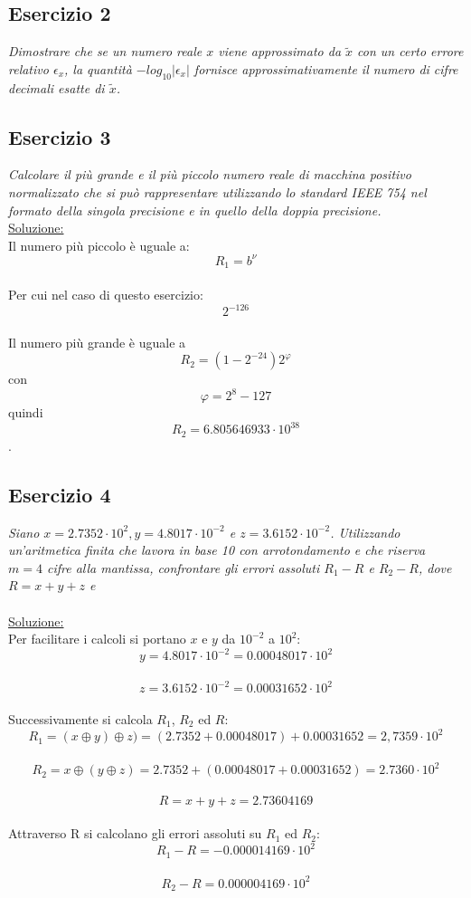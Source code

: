 \subsection{Esercizio 2}
\emph{Dimostrare che se un numero reale $x $ viene approssimato da $\tilde{x}$ con un certo errore relativo $\epsilon_{x}$, la quantità $-log_{10}|\epsilon_{x}|$ fornisce approssimativamente il numero di cifre decimali esatte di $\tilde{x}$.}

\subsection{Esercizio 3}
\emph{Calcolare il più grande e il più piccolo numero reale di macchina positivo normalizzato che si può rappresentare utilizzando lo standard IEEE 754 nel formato della singola precisione e in quello della doppia precisione.}\\
\underline{Soluzione:}\\
Il numero più piccolo è uguale a: $$R_{1} = b^{\nu} $$ \\
Per cui nel caso di questo esercizio: $$2^{-126}$$\\
Il numero più grande è uguale a $$R_{2} = (1-2^{-24}) 2^{\varphi} $$ con $$ \varphi = 2^{8}-127 $$ quindi $$ R_{2} = 6.805646933 \cdot 10^{38}$$.

\subsection{Esercizio 4}
\emph{Siano $ x = 2.7352 \cdot 10^{2}, y = 4.8017 \cdot 10^{-2}$ e $z = 3.6152 \cdot 10^{-2}$. Utilizzando un'aritmetica finita che lavora in base 10 con arrotondamento e che riserva $ m = 4 $ cifre alla mantissa, confrontare gli errori assoluti $ R_{1}-R$ e $R_{2}-R$, dove $ R = x+y+z$ e \\}
 \\
\flushleft
\underline{Soluzione:}\\
Per facilitare i calcoli si portano $ x $ e $ y $ da $ 10 ^ {-2} $ a $ 10^{2} $:\\
$$ y = 4.8017 \cdot 10^{-2} = 0.00048017 \cdot 10^{2} $$ \\
$$ z = 3.6152 \cdot 10^{-2} = 0.00031652 \cdot 10^{2} $$ \\
Successivamente si calcola $R_{1}$, $R_{2}$ ed $R$:\\
$$ R_{1} = (x \oplus y) \oplus z)  = (2.7352 + 0.00048017) + 0.00031652 = 2,7359 \cdot 10^{2}$$\\
$$ R_{2} = x \oplus ( y \oplus z) = 2.7352 + (0.00048017 + 0.00031652) = 2.7360 \cdot 10^{2} $$ \\
$$ R = x+y+z = 2.73604169 $$ \\
Attraverso R si calcolano gli errori assoluti su $R_{1}$ ed $R_{2}$: \\
$$R_{1}-R = -0.000014169 \cdot 10^{2} $$\\
$$R_{2}-R = 0.000004169 \cdot 10^{2} $$ \\


